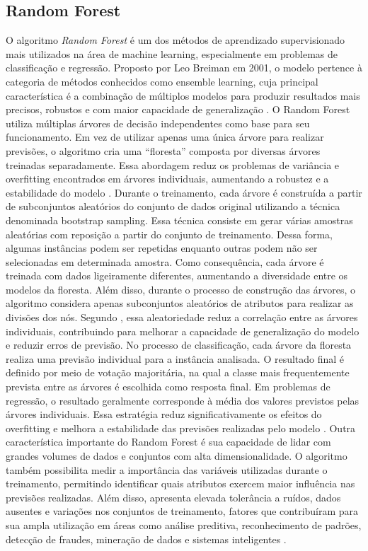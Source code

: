 \documentclass[
    12pt,                %
    openright,           %
    oneside,             %
    a4paper,             %
    english,             %
    brazil               %
]{abntex2}
\begin{document}
\subsection{Random Forest}
O algoritmo \textit{Random Forest} é um dos métodos de aprendizado supervisionado mais utilizados na área de machine learning, especialmente em problemas de classificação e regressão. Proposto por Leo Breiman em 2001, o modelo pertence à categoria de métodos conhecidos como ensemble learning, cuja principal característica é a combinação de múltiplos modelos para produzir resultados mais precisos, robustos e com maior capacidade de generalização \cite{Breiman2001}.
O Random Forest utiliza múltiplas árvores de decisão independentes como base para seu funcionamento. Em vez de utilizar apenas uma única árvore para realizar previsões, o algoritmo cria uma “floresta” composta por diversas árvores treinadas separadamente. Essa abordagem reduz os problemas de variância e overfitting encontrados em árvores individuais, aumentando a robustez e a estabilidade do modelo \cite{Breiman2001}.
Durante o treinamento, cada árvore é construída a partir de subconjuntos aleatórios do conjunto de dados original utilizando a técnica denominada bootstrap sampling. Essa técnica consiste em gerar várias amostras aleatórias com reposição a partir do conjunto de treinamento. Dessa forma, algumas instâncias podem ser repetidas enquanto outras podem não ser selecionadas em determinada amostra. Como consequência, cada árvore é treinada com dados ligeiramente diferentes, aumentando a diversidade entre os modelos da floresta.
Além disso, durante o processo de construção das árvores, o algoritmo considera apenas subconjuntos aleatórios de atributos para realizar as divisões dos nós. Segundo , essa aleatoriedade reduz a correlação entre as árvores individuais, contribuindo para melhorar a capacidade de generalização do modelo e reduzir erros de previsão.
No processo de classificação, cada árvore da floresta realiza uma previsão individual para a instância analisada. O resultado final é definido por meio de votação majoritária, na qual a classe mais frequentemente prevista entre as árvores é escolhida como resposta final. Em problemas de regressão, o resultado geralmente corresponde à média dos valores previstos pelas árvores individuais. Essa estratégia reduz significativamente os efeitos do overfitting e melhora a estabilidade das previsões realizadas pelo modelo \cite{Breiman2001}.
Outra característica importante do Random Forest é sua capacidade de lidar com grandes volumes de dados e conjuntos com alta dimensionalidade. O algoritmo também possibilita medir a importância das variáveis utilizadas durante o treinamento, permitindo identificar quais atributos exercem maior influência nas previsões realizadas. Além disso, apresenta elevada tolerância a ruídos, dados ausentes e variações nos conjuntos de treinamento, fatores que contribuíram para sua ampla utilização em áreas como análise preditiva, reconhecimento de padrões, detecção de fraudes, mineração de dados e sistemas inteligentes \cite{Breiman2001}.
\end{document}
